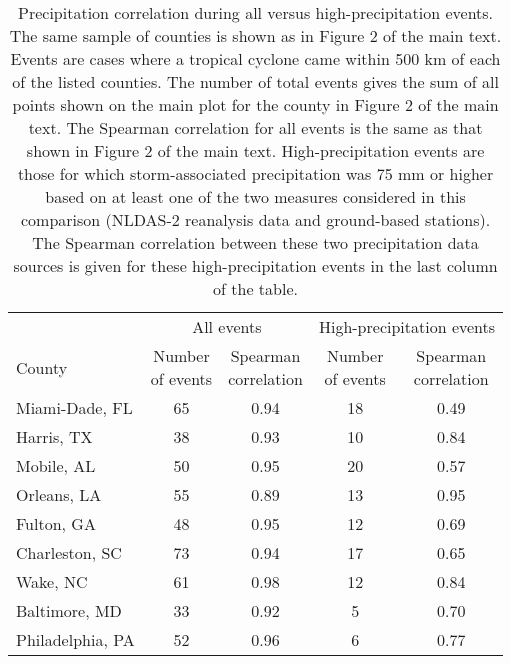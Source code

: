 \begin{table}

\caption{\label{tab:highprecipcorr}Precipitation correlation during all versus high-precipitation events.
                     The same sample of counties is shown as in Figure 2 of the main text.
                     Events are cases where a tropical cyclone came within 500 km of each of the 
                     listed counties. The number of total events gives the sum of all points
                     shown on the main plot for the county in Figure 2 of the main text. 
                     The Spearman correlation for all events is the same as that shown in Figure 2
                     of the main text. High-precipitation events are those for which storm-associated
                     precipitation was 75 mm or higher based on at least one of the two measures
                     considered in this comparison (NLDAS-2 reanalysis data and ground-based stations). The Spearman correlation between these two precipitation data sources is given
                     for these high-precipitation events in the last column of the 
                     table.}
\centering
\begin{tabular}[t]{lcccc}
\toprule
\multicolumn{1}{c}{ } & \multicolumn{2}{c}{All events} & \multicolumn{2}{c}{High-precipitation events} \\
\cmidrule(l{3pt}r{3pt}){2-3} \cmidrule(l{3pt}r{3pt}){4-5}
County & \makecell[c]{Number\\of events} & \makecell[c]{Spearman\\correlation} & \makecell[c]{Number\\of events} & \makecell[c]{Spearman\\correlation}\\
\midrule
Miami-Dade, FL & 65 & 0.94 & 18 & 0.49\\
Harris, TX & 38 & 0.93 & 10 & 0.84\\
Mobile, AL & 50 & 0.95 & 20 & 0.57\\
Orleans, LA & 55 & 0.89 & 13 & 0.95\\
Fulton, GA & 48 & 0.95 & 12 & 0.69\\
\addlinespace
Charleston, SC & 73 & 0.94 & 17 & 0.65\\
Wake, NC & 61 & 0.98 & 12 & 0.84\\
Baltimore, MD & 33 & 0.92 & 5 & 0.70\\
Philadelphia, PA & 52 & 0.96 & 6 & 0.77\\
\bottomrule
\end{tabular}
\end{table}
